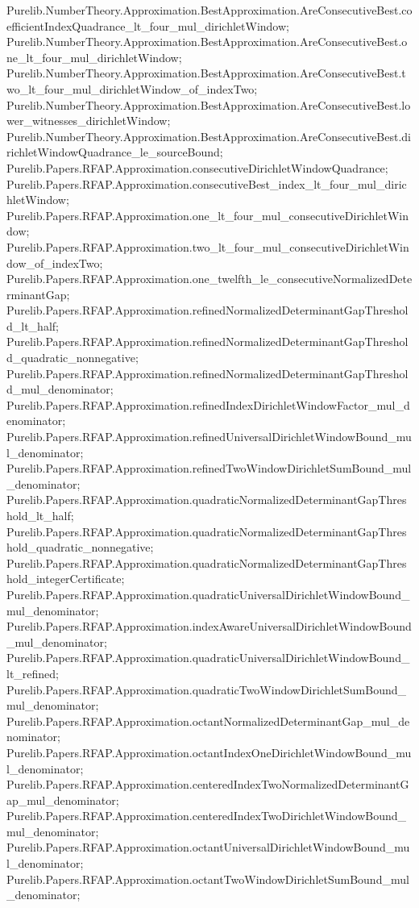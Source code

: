 \documentclass[11pt]{article}
\begin{document}
{Purelib.NumberTheory.Approximation.BestApproximation.AreConsecutiveBest.coefficientIndexQuadrance_lt_four_mul_dirichletWindow;
Purelib.NumberTheory.Approximation.BestApproximation.AreConsecutiveBest.one_lt_four_mul_dirichletWindow;
Purelib.NumberTheory.Approximation.BestApproximation.AreConsecutiveBest.two_lt_four_mul_dirichletWindow_of_indexTwo;
Purelib.NumberTheory.Approximation.BestApproximation.AreConsecutiveBest.lower_witnesses_dirichletWindow;
Purelib.NumberTheory.Approximation.BestApproximation.AreConsecutiveBest.dirichletWindowQuadrance_le_sourceBound;
Purelib.Papers.RFAP.Approximation.consecutiveDirichletWindowQuadrance;
Purelib.Papers.RFAP.Approximation.consecutiveBest_index_lt_four_mul_dirichletWindow;
Purelib.Papers.RFAP.Approximation.one_lt_four_mul_consecutiveDirichletWindow;
Purelib.Papers.RFAP.Approximation.two_lt_four_mul_consecutiveDirichletWindow_of_indexTwo;
Purelib.Papers.RFAP.Approximation.one_twelfth_le_consecutiveNormalizedDeterminantGap;
Purelib.Papers.RFAP.Approximation.refinedNormalizedDeterminantGapThreshold_lt_half;
Purelib.Papers.RFAP.Approximation.refinedNormalizedDeterminantGapThreshold_quadratic_nonnegative;
Purelib.Papers.RFAP.Approximation.refinedNormalizedDeterminantGapThreshold_mul_denominator;
Purelib.Papers.RFAP.Approximation.refinedIndexDirichletWindowFactor_mul_denominator;
Purelib.Papers.RFAP.Approximation.refinedUniversalDirichletWindowBound_mul_denominator;
Purelib.Papers.RFAP.Approximation.refinedTwoWindowDirichletSumBound_mul_denominator;
Purelib.Papers.RFAP.Approximation.quadraticNormalizedDeterminantGapThreshold_lt_half;
Purelib.Papers.RFAP.Approximation.quadraticNormalizedDeterminantGapThreshold_quadratic_nonnegative;
Purelib.Papers.RFAP.Approximation.quadraticNormalizedDeterminantGapThreshold_integerCertificate;
Purelib.Papers.RFAP.Approximation.quadraticUniversalDirichletWindowBound_mul_denominator;
Purelib.Papers.RFAP.Approximation.indexAwareUniversalDirichletWindowBound_mul_denominator;
Purelib.Papers.RFAP.Approximation.quadraticUniversalDirichletWindowBound_lt_refined;
Purelib.Papers.RFAP.Approximation.quadraticTwoWindowDirichletSumBound_mul_denominator;
Purelib.Papers.RFAP.Approximation.octantNormalizedDeterminantGap_mul_denominator;
Purelib.Papers.RFAP.Approximation.octantIndexOneDirichletWindowBound_mul_denominator;
Purelib.Papers.RFAP.Approximation.centeredIndexTwoNormalizedDeterminantGap_mul_denominator;
Purelib.Papers.RFAP.Approximation.centeredIndexTwoDirichletWindowBound_mul_denominator;
Purelib.Papers.RFAP.Approximation.octantUniversalDirichletWindowBound_mul_denominator;
Purelib.Papers.RFAP.Approximation.octantTwoWindowDirichletSumBound_mul_denominator;
}
\end{document}
